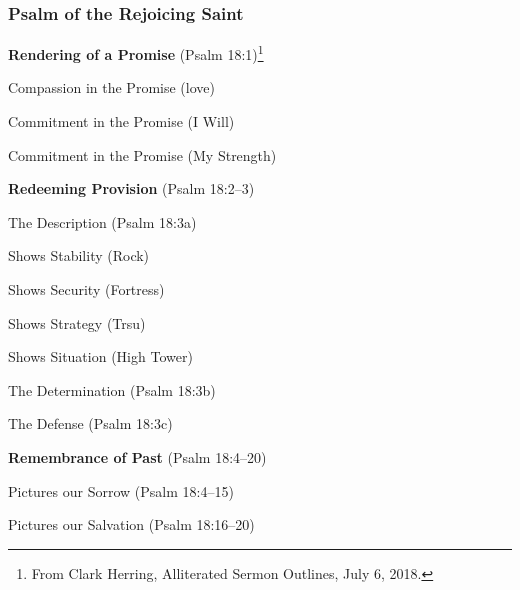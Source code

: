 \subsubsection{Psalm of the Rejoicing Saint}

\begin{compactenum}[I.]
    \item \textbf{Rendering of a Promise}   (Psalm 18:1)\footnote{From Clark Herring, Alliterated Sermon Outlines, July 6, 2018.}
    \begin{compactenum}[A.]
    		\item Compassion in the Promise (love)
    		\item Commitment in the Promise (I Will)
    		\item Commitment in the Promise (My Strength)
	\end{compactenum}
    \item \textbf{Redeeming Provision}   (Psalm 18:2--3)
    \begin{compactenum}[A.]
    		\item The Description   (Psalm 18:3a)
    		    \begin{compactenum}[1.]
    		    		\item Shows Stability (Rock)
    		    		\item Shows Security (Fortress)
    		    		\item Shows Strategy (Trsu)
    		    		\item Shows Situation (High Tower)
			\end{compactenum}
    		\item The Determination    (Psalm 18:3b)
    		\item The Defense    (Psalm 18:3c)
	\end{compactenum}
    \item \textbf{Remembrance of Past}   (Psalm 18:4--20)
    \begin{compactenum}[A.]
    		\item Pictures our Sorrow   (Psalm 18:4--15)
    		\item Pictures our Salvation   (Psalm 18:16--20)

\end{compactenum}
\end{compactenum}
